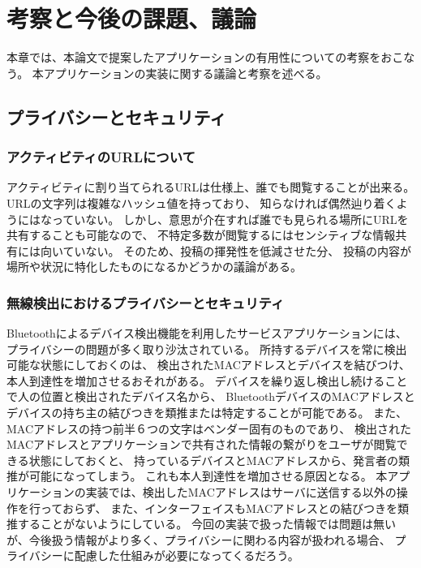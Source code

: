 \chapter{考察と今後の課題、議論}
\label{chap:discussion}

本章では、本論文で提案したアプリケーションの有用性についての考察をおこなう。
本アプリケーションの実装に関する議論と考察を述べる。


\newpage

\section{プライバシーとセキュリティ}

\subsection{アクティビティのURLについて}

アクティビティに割り当てられるURLは仕様上、誰でも閲覧することが出来る。
URLの文字列は複雑なハッシュ値を持っており、
知らなければ偶然辿り着くようにはなっていない。
しかし、意思が介在すれば誰でも見られる場所にURLを共有することも可能なので、
不特定多数が閲覧するにはセンシティブな情報共有には向いていない。
そのため、投稿の揮発性を低減させた分、
投稿の内容が場所や状況に特化したものになるかどうかの議論がある。


\subsection{無線検出におけるプライバシーとセキュリティ}

Bluetoothによるデバイス検出機能を利用したサービスアプリケーションには、
プライバシーの問題が多く取り沙汰されている。
所持するデバイスを常に検出可能な状態にしておくのは、
検出されたMACアドレスとデバイスを結びつけ、本人到達性を増加させるおそれがある。
デバイスを繰り返し検出し続けることで人の位置と検出されたデバイス名から、
BluetoothデバイスのMACアドレスとデバイスの持ち主の結びつきを類推または特定することが可能である。
また、MACアドレスの持つ前半６つの文字はベンダー固有のものであり、
検出されたMACアドレスとアプリケーションで共有された情報の繋がりをユーザが閲覧できる状態にしておくと、
持っているデバイスとMACアドレスから、発言者の類推が可能になってしまう。
これも本人到達性を増加させる原因となる。
本アプリケーションの実装では、検出したMACアドレスはサーバに送信する以外の操作を行っておらず、
また、インターフェイスもMACアドレスとの結びつきを類推することがないようにしている。
今回の実装で扱った情報では問題は無いが、今後扱う情報がより多く、プライバシーに関わる内容が扱われる場合、
プライバシーに配慮した仕組みが必要になってくるだろう。


